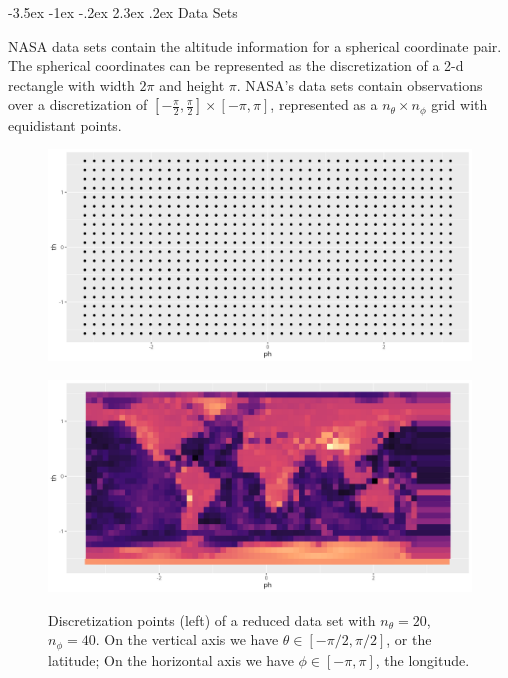 \documentclass[a4paper]{article}
\makeatletter
\renewcommand\section{\@startsection{section}{1}{\z@}%
                                  {-3.5ex \@plus -1ex \@minus -.2ex}%
                                  {2.3ex \@plus.2ex}%
                                  {\normalfont\normalsize\bfseries}}
\theoremstyle{definition}
\makeatother
\begin{document}
\newpage

\section{Data Sets}

NASA data sets contain the altitude information for a spherical coordinate pair. The spherical coordinates can
be represented as the discretization of a 2-d rectangle with width $2\pi$ and height $\pi$. NASA's data sets contain observations
over a discretization of $[-\frac{\pi}{2}, \frac{\pi}{2}] \times [-\pi, \pi]$, represented as a $n_\theta \times n_\phi$ grid with equidistant points.

\begin{figure}[h!]
    \centering
    \begin{minipage}{.5\textwidth}
      \centering
      \includegraphics[width=.95\linewidth]{media/discretized_grid.png}
      \label{fig:test1}
    \end{minipage}%
    \begin{minipage}{.5\textwidth}
      \centering
      \includegraphics[width=.95\linewidth]{media/discretized_reduced.png}
      \label{fig:test2}
    \end{minipage}
    \caption{Discretization points (left) of a reduced data set with $n_\theta = 20$, $n_\phi = 40$. On the vertical axis we have $\theta \in [-\pi/2, \pi/2]$, or the latitude; On 
    the horizontal axis we have $\phi \in [-\pi, \pi]$, the longitude.}
\end{figure}
\end{document}
